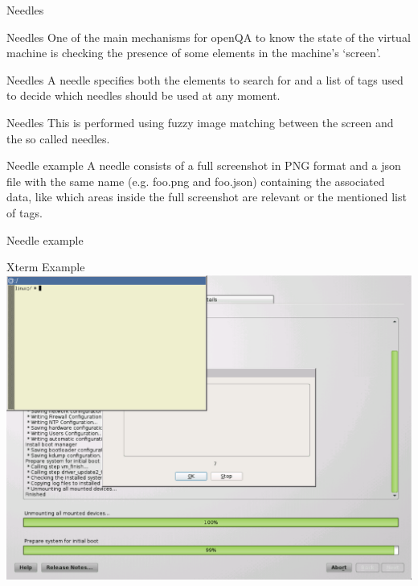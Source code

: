 \documentclass{beamer}
\begin{document}
    \begin{frame}
        \center\huge Needles
    \end{frame}

    \begin{frame}{Needles}
        One of the main mechanisms for openQA to know the state of the virtual
        machine is checking the presence of some elements in the machine's `screen'.
    \end{frame}

    \begin{frame}{Needles}
         A needle specifies both the elements to search for and a list of tags
         used to decide which needles should be used at any moment.
    \end{frame}

    \begin{frame}{Needles}
        This is performed using fuzzy image matching between the screen and the so called needles.
    \end{frame}

    \begin{frame}{Needle example}
        A needle consists of a full screenshot in PNG format and a json file
        with the same name (e.g. foo.png and foo.json) containing the
        associated data, like which areas inside the full screenshot are
        relevant or the mentioned list of tags.
    \end{frame}

    \begin{frame}{Needle example}
        \scriptsize
        
    \end{frame}

    \begin{frame}{Xterm Example}
        \includegraphics[scale=0.25]{files/xterm-in-yast.eps}
    \end{frame}
\end{document}
